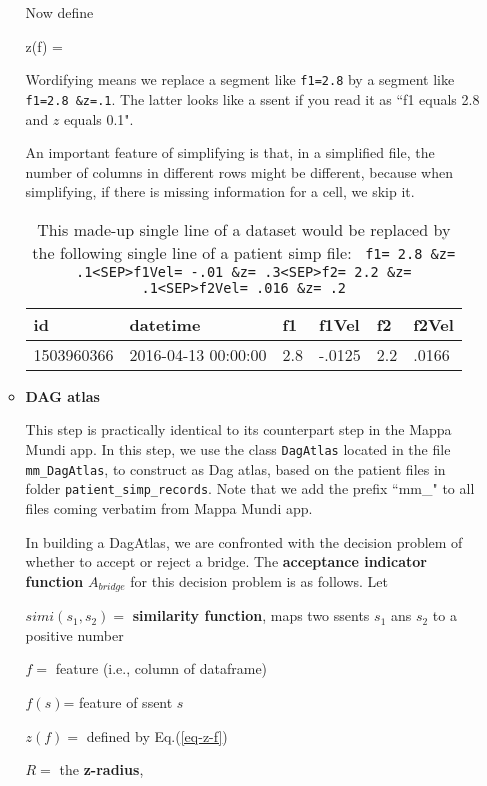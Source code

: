 \documentclass[12pt]{article}
\begin{document}
\begin{enumerate}
\begin{itemize}
Now define

\beq
z(f) = 
\label{eq-z-f}
\eeq

Wordifying means we replace 
a segment like {\tt f1=2.8}
by a segment like {\tt f1=2.8 \&z=.1}.
The latter looks like a ssent if you 
read it as  ``f1 equals 2.8 and $z$ equals 0.1".

An important feature of simplifying
is that, in a simplified file, the number of columns 
in different rows might be different,
because when simplifying, if there is missing information for 
a cell, we skip it.

\begin{table}[h!]
\centering
\begin{tabular}{|l|l|l|l|l|l|}
\hline
\rowcolor[HTML]{FFFFC7} 
id & datetime & f1 & f1Vel & f2 & f2Vel \\ \hline
1503960366 & 2016-04-13 00:00:00 & 2.8 & -.0125 & 2.2 & .0166 \\ \hline
\end{tabular}
\caption{This made-up single line
of a dataset would be replaced
by the following single line 
of a patient simp file: 
{\tt
f1= 2.8 \&z= .1<SEP>f1Vel= -.01 \&z= .3<SEP>f2= 2.2 \&z= .1<SEP>f2Vel= .016 \&z= .2}
}
\label{tab-simplifying}
\end{table}




\item {\bf DAG atlas}

This step is practically
identical
to its counterpart
step in the Mappa Mundi app.
In this step, we
use the class {\tt DagAtlas}
located in the file
{\tt mm\_DagAtlas}, to construct 
as Dag atlas, 
based on the 
patient files in folder
{\tt patient\_simp\_records}.
Note that we add the prefix ``mm\_" 
to all files coming verbatim from
Mappa Mundi app.

In building a DagAtlas,
we are confronted with
the decision problem of whether to accept or reject a bridge. The {\bf acceptance indicator function} $A_{bridge}$
 for this
decision problem is as follows.
Let 

$simi(s_1, s_2)=$ {\bf similarity function}, maps two ssents $s_1$ ans $s_2$ to a positive number

$f=$ feature (i.e., column of dataframe)

$f(s)$= feature of ssent $s$

$z(f)=$ defined by Eq.(\ref{eq-z-f})

$R=$ the {\bf z-radius},


\end{itemize}
\end{enumerate}
\end{document}
